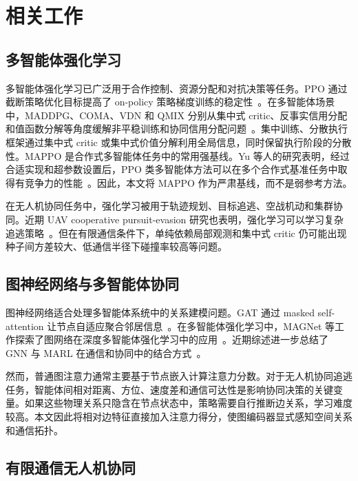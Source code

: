 \section{相关工作}

\subsection{多智能体强化学习}

多智能体强化学习已广泛用于合作控制、资源分配和对抗决策等任务。PPO 通过截断策略优化目标提高了 on-policy 策略梯度训练的稳定性~\cite{schulman2017ppo}。在多智能体场景中，MADDPG、COMA、VDN 和 QMIX 分别从集中式 critic、反事实信用分配和值函数分解等角度缓解非平稳训练和协同信用分配问题~\cite{lowe2017maddpg,foerster2018coma,sunehag2018vdn,rashid2018qmix}。集中训练、分散执行框架通过集中式 critic 或集中式价值分解利用全局信息，同时保留执行阶段的分散性。MAPPO 是合作式多智能体任务中的常用强基线。Yu 等人的研究表明，经过合适实现和超参数设置后，PPO 类多智能体方法可以在多个合作式基准任务中取得有竞争力的性能~\cite{yu2021mappo}。因此，本文将 MAPPO 作为严肃基线，而不是弱参考方法。

在无人机协同任务中，强化学习被用于轨迹规划、目标追逃、空战机动和集群协同。近期 UAV cooperative pursuit-evasion 研究也表明，强化学习可以学习复杂追逃策略~\cite{zhao2024uav_pursuit_evasion}。但在有限通信条件下，单纯依赖局部观测和集中式 critic 仍可能出现种子间方差较大、低通信半径下碰撞率较高等问题。

\subsection{图神经网络与多智能体协同}

图神经网络适合处理多智能体系统中的关系建模问题。GAT 通过 masked self-attention 让节点自适应聚合邻居信息~\cite{velickovic2017gat}。在多智能体强化学习中，MAGNet 等工作探索了图网络在深度多智能体强化学习中的应用~\cite{malysheva2020magnet}。近期综述进一步总结了 GNN 与 MARL 在通信和协同中的结合方式~\cite{liu2024gnn_marl,cuzin2026gnn_comm_survey}。

然而，普通图注意力通常主要基于节点嵌入计算注意力分数。对于无人机协同追逃任务，智能体间相对距离、方位、速度差和通信可达性是影响协同决策的关键变量。如果这些物理关系只隐含在节点状态中，策略需要自行推断边关系，学习难度较高。本文因此将相对边特征直接加入注意力得分，使图编码器显式感知空间关系和通信拓扑。

\subsection{有限通信无人机协同}

